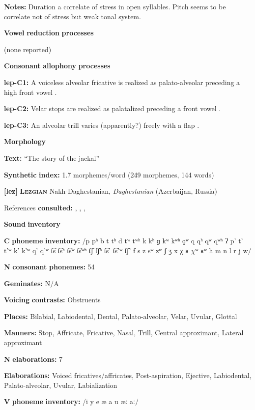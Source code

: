 \begin{styleBody}
\textbf{Notes:} Duration a correlate of stress in open syllables. Pitch seems to be correlate not of stress but weak tonal system.

\textbf{Vowel} \textbf{reduction} \textbf{processes}

(none reported)

\textbf{Consonant} \textbf{allophony} \textbf{processes}

\textbf{lep-C1:} A voiceless alveolar fricative is realized as palato-alveolar preceding a high front vowel \citep[27]{Plaisier2007}.

\textbf{lep-C2:} Velar stops are realized as palatalized preceding a front vowel \citep[21]{Plaisier2007}.

\textbf{lep-C3:} An alveolar trill varies (apparently?) freely with a flap \citep[28]{Plaisier2007}.

\textbf{Morphology}

\textbf{Text:} “The story of the jackal” \citep[165-168]{Plaisier2007}

\textbf{Synthetic} \textbf{index:} 1.7 morphemes/word (249 morphemes, 144 words)

\textbf{[lez]}   \textbf{\textsc{Lezgian}}  Nakh-Daghestanian, \textit{Daghestanian} (Azerbaijan, Russia)

References \textbf{consulted:} \citet{ChitoranBabaliyeva2007}, \citet{Haspelmath1993}, \citet{Kodzasov1990}, \citet{Yu2004}

\textbf{Sound} \textbf{inventory}

\textbf{C} \textbf{phoneme} \textbf{inventory:} /p pʰ b t tʰ d tʷ tʷʰ k kʰ ɡ kʷ kʷʰ ɡʷ q qʰ qʷ qʷʰ ʔ p’ t’ t’ʷ k’ k’ʷ q’ q’ʷ t͡s t͡sʰ t͡sʷ t͡sʷʰ t͡ʃ t͡ʃʰ t͡s’ t͡s’ʷ t͡ʃ’ f s z sʷ zʷ ʃ ʒ x χ ʁ $\chi ʷ$ ʁʷ h m n l r j w/

\textbf{N} \textbf{consonant} \textbf{phonemes:} 54

\textbf{Geminates:} N/A

\textbf{Voicing} \textbf{contrasts:} Obstruents

\textbf{Places:} Bilabial, Labiodental, Dental, Palato-alveolar, Velar, Uvular, Glottal

\textbf{Manners:} Stop, Affricate, Fricative, Nasal, Trill, Central approximant, Lateral approximant

\textbf{N} \textbf{elaborations:} 7

\textbf{Elaborations:} Voiced fricatives/affricates, Post-aspiration, Ejective, Labiodental, Palato-alveolar, Uvular, Labialization

\textbf{V} \textbf{phoneme} \textbf{inventory:} /i y e æ a u æː aː/


\end{styleBody}
